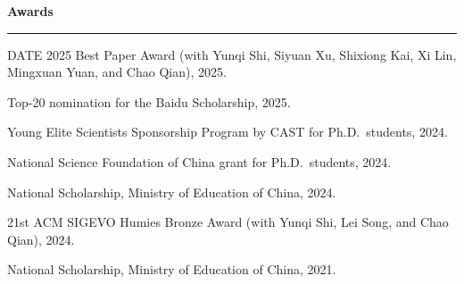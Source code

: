 \documentclass[11pt,a4paper]{article}
\newcommand{\cvsection}[1]{%
  \vspace{0.65em}%
  \noindent\textbf{\large #1}\\[-0.15em]
  \rule{\textwidth}{0.4pt}%
  \vspace{0.4em}%
}
\begin{document}
\cvsection{Awards}
\begin{cvbullet}
  \item DATE 2025 Best Paper Award (with Yunqi Shi, Siyuan Xu, Shixiong Kai, Xi Lin, Mingxuan Yuan, and Chao Qian), 2025.
  \item Top-20 nomination for the Baidu Scholarship, 2025.
  \item Young Elite Scientists Sponsorship Program by CAST for Ph.D.\ students, 2024.
  \item National Science Foundation of China grant for Ph.D.\ students, 2024.
  \item National Scholarship, Ministry of Education of China, 2024.
  \item 21st ACM SIGEVO Humies Bronze Award (with Yunqi Shi, Lei Song, and Chao Qian), 2024.
  \item National Scholarship, Ministry of Education of China, 2021.
\end{cvbullet}
\end{document}

